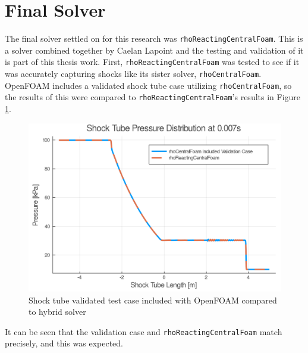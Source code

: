 \section{Final Solver}

The final solver settled on for this research was \verb|rhoReactingCentralFoam|. This is a solver combined together by Caelan Lapoint and the testing and validation of it is part of this thesis work. First, \verb|rhoReactingCentralFoam| was tested to see if it was accurately capturing shocks like its sister solver, \verb|rhoCentralFoam|. OpenFOAM includes a validated shock tube case utilizing \verb|rhoCentralFoam|, so the results of this were compared to \verb|rhoReactingCentralFoam|'s results in Figure \ref{fig:sod}. 
\begin{figure}[H]
\centering
\includegraphics[width=0.85\linewidth]{./figs/shocktube.png} 
\caption{Shock tube validated test case included with OpenFOAM compared to hybrid solver}
\label{fig:sod}
\end{figure}%
\noindent It can be seen that the validation case and \verb|rhoReactingCentralFoam| match precisely, and this was expected. 



